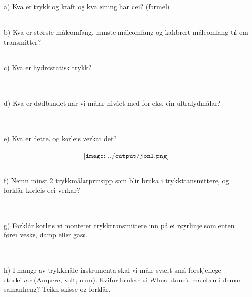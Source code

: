 a) Kva er trykk og kraft og kva eining har dei? (formel) 
\\
\\
b) Kva er største måleomfang, minste måleomfang og kalibrert måleomfang til ein transmitter? 
\\
\\
c) Kva er hydrostatisk trykk? 
\\\\
\\
d) Kva er dødbandet når vi målar nivået med for eks. ein ultralydmålar? 
\\\\
\\
e) Kva er dette, og korleis verkar det?	 
\\\\
$$\texttt{[image: ../output/jon1.png]}$$
\\
\eject
f) Nemn minst 2 trykkmålarprinsipp som blir bruka i trykktransmittere, og forklår korleis dei verkar? 
\\\\
\\
g) Forklår korleis vi monterer trykktransmittere inn på ei røyrlinje som enten fører veske, damp eller gass. 
\\\\
\\
\eject
h) I mange av trykkmåle instrumenta skal vi måle svært små forskjellege storleikar (Ampere, volt, ohm). Kvifor brukar vi Wheatstone’s målebru i denne samanheng? Teikn skisse og forklår. 
